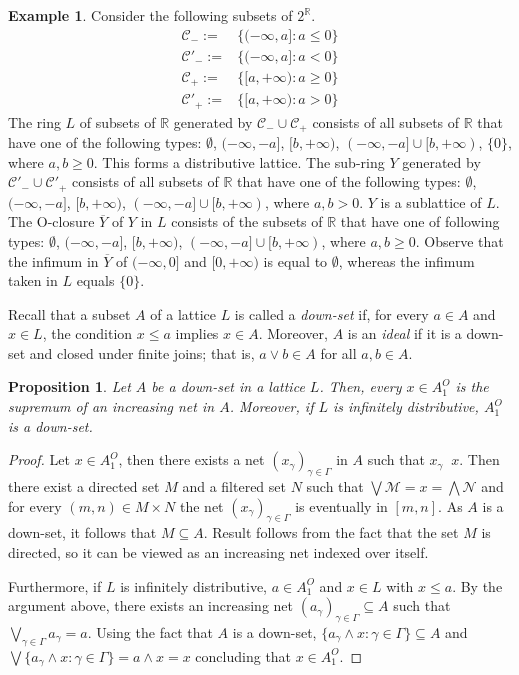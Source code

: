 \documentclass[12pt,a4paper]{amsart}
\numberwithin{equation}{section}
\newtheorem{prop}[thm]{Proposition}
\theoremstyle{definition}
\newtheorem{exmp}[thm]{Example}
\newcommand{\converges}[1]{\mathop{\overset{\text{#1}}{\longrightarrow}}}
\newcommand{\R}{\mathds R}
\newcommand{\mm}{\mathscr M}
\newcommand{\nn}{\mathscr N}
\begin{document}
\begin{exmp}
Consider the following subsets of $2^\R$.
\begin{align*}
\mathscr C_-:=&\{(-\infty,a]:a\le 0\}\\
\mathscr C'_-:=&\{(-\infty,a]:a< 0\}\\
\mathscr C_+:=&\{[a,+\infty):a\ge 0\}\\
\mathscr C'_+:=&\{[a,+\infty):a> 0\}
\end{align*}
The ring $ L$ of subsets of $\R$ generated by $\mathscr C_-\cup\mathscr C_+$
consists of all subsets of $\R$ that have one of the following types: $\emptyset$, $(-\infty,-a]$, $[b,+\infty)$, $(-\infty,-a]\cup [b,+\infty)$, $\{0\}$, where $a,b\ge 0$.
This forms a distributive lattice.  The sub-ring $Y$ generated by $\mathscr C'_-\cup\mathscr C'_+$ consists of all subsets of $\R$ that have one of the following types: $\emptyset$, $(-\infty,-a]$, $[b,+\infty)$, $(-\infty,-a]\cup [b,+\infty)$, where $a,b> 0$. $Y$ is a sublattice of $L$.   The O-closure $\overline Y$ of $Y$  in $L$ consists of the subsets of $\R$ that have one of following types: $\emptyset$, $(-\infty,-a]$,  $[b,+\infty)$,  $(-\infty,-a]\cup [b,+\infty)$, where $a,b\ge 0$.
Observe that the infimum in $\overline Y$ of $(-\infty,0]$ and $[0,+\infty)$ is equal to $\emptyset$, whereas the infimum taken in $L$ equals $\{0\}$.
\end{exmp}


Recall that a subset $A$ of a lattice $L$ is
 called a \emph{down-set} if, for every $a\in A$ and $x\in L$, the condition $x\le a$ implies $x\in A$.  Moreover, $A$ is an 
 \emph{ideal} if 
it is a down-set and closed under finite joins; that is,
 $a\vee b\in A$ for all $a, b\in A$.



\begin{prop}\label{11}
	Let $ A$ be a down-set in a lattice $ L$. Then, every $x \in  A_{1}^{O}$ is the supremum of an increasing net in $ A$. Moreover, if $ L$ is infinitely distributive, $ A_{1}^{O}$ is a down-set.
\end{prop}
\begin{proof}
Let $x \in  A_{1}^{O}$, then there exists a net $(x_{\gamma})_{\gamma \in \Gamma}$ in $A$ such that $x_{\gamma} \converges{O} x$. Then there exist a directed set $M$ and a filtered set $N$ such that $\bigvee \mm = x = \bigwedge \nn$ and for every $(m,n) \in M\times N$ the net $(x_{\gamma})_{\gamma \in \Gamma}$ is eventually in $[m,n]$. As $ A$ is a down-set, it follows that $M\subseteq  A$. Result follows from the fact that the set $M$ is directed, so it can be viewed as an increasing net indexed over itself.
  	
  	Furthermore, if $L$ is infinitely distributive, $a \in  A_{1}^{O}$ and $x \in  L$ with $x \leq a$. By the argument above, there exists an increasing net $(a_{\gamma})_{\gamma \in \Gamma} \subseteq  A$ such that $\bigvee_{\gamma \in \Gamma} a_{\gamma} = a$. Using the fact that $ A$ is a down-set, $\{a_{\gamma} \wedge x : \gamma \in \Gamma \} \subseteq  A$ and $\bigvee \{a_{\gamma} \wedge x : \gamma \in \Gamma \} = a \wedge x = x$ concluding that $x \in  A_{1}^{O}$.\end{proof}
\end{document}
